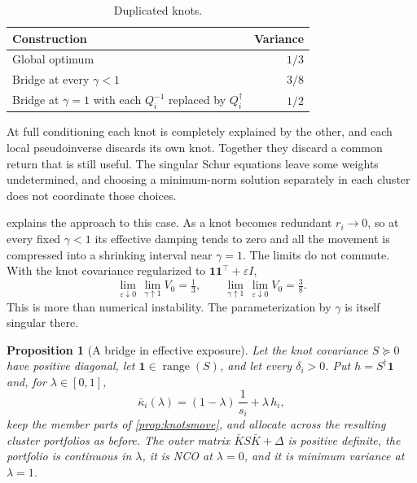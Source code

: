\documentclass[11pt]{article}
\newcommand{\ones}{\mathbf{1}}
\newtheorem{proposition}{Proposition}
\begin{document}
\begin{table}[ht]
\centering
\begin{tabular}{@{}lr@{}}
\toprule
Construction & Variance \\
\midrule
Global optimum & $1/3$ \\
Bridge at every $\gamma<1$ & $3/8$ \\
Bridge at $\gamma=1$ with each $Q_i^{-1}$ replaced by $Q_i^\dagger$ & $1/2$ \\
\bottomrule
\end{tabular}
\caption{Duplicated knots.}
\label{tab:duplicate}
\end{table}

At full conditioning each knot is completely explained by the other, and
each local pseudoinverse discards its own knot. Together they discard a
common return that is still useful. The singular Schur equations leave some
weights undetermined, and choosing a minimum-norm solution separately in
each cluster does not coordinate those choices.

 explains the approach to this case. As a knot becomes
redundant $r_i\to0$, so at every fixed $\gamma<1$ its effective damping
tends to zero and all the movement is compressed into a shrinking interval
near $\gamma=1$. The limits do not commute. With the knot covariance
regularized to $\ones\ones^\top+\varepsilon I$,
\begin{equation*}
  \lim_{\varepsilon\downarrow0}\,\lim_{\gamma\uparrow1}V_0=\tfrac13,
  \qquad
  \lim_{\gamma\uparrow1}\,\lim_{\varepsilon\downarrow0}V_0=\tfrac38 .
\end{equation*}
This is more than numerical instability. The parameterization by $\gamma$
is itself singular there.

\begin{proposition}[A bridge in effective exposure]
\label{prop:lambda}
Let the knot covariance $S\succeq0$ have positive diagonal, let
$\ones\in\operatorname{range}(S)$, and let every $\delta_i>0$. Put
$h=S^\dagger\ones$ and, for $\lambda\in[0,1]$,
\begin{equation}
  \bar\kappa_i(\lambda)=(1-\lambda)\,\frac1{s_i}+\lambda\,h_i ,
  \label{eq:lambdapath}
\end{equation}
keep the member parts of \cref{prop:knotsmove}, and allocate across the
resulting cluster portfolios as before. The outer matrix
$\bar K S\bar K+\Delta$ is positive definite, the portfolio is continuous in
$\lambda$, it is NCO at $\lambda=0$, and it is minimum variance at
$\lambda=1$.
\end{proposition}
\end{document}

